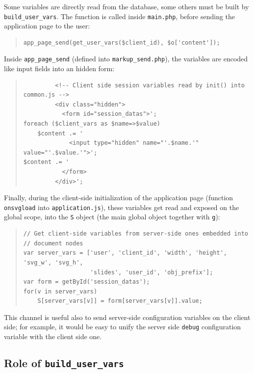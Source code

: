 \documentclass[10pt,a4paper,english]{book}
\begin{document}
Some variables are directly read from the database, some others must
be built by \texttt{build{\_}user{\_}vars}. The function is called inside
\texttt{main.php}, before sending the application page to the user:
\begin{quote}\begin{verbatim}
app_page_send(get_user_vars($client_id), $o['content']);
\end{verbatim}
\end{quote}

Inside \texttt{app{\_}page{\_}send} (defined into \texttt{markup{\_}send.php}), the
variables are encoded like input fields into an hidden form:
\begin{quote}\begin{verbatim}
         <!-- Client side session variables read by init() into common.js -->
         <div class="hidden">
           <form id="session_datas">';
foreach ($client_vars as $name=>$value)
    $content .= '
             <input type="hidden" name="'.$name.'" value="'.$value.'">';
$content .= '
           </form>
         </div>';
\end{verbatim}
\end{quote}

Finally, during the client-side initialization of the application page
(function \texttt{onsvgload} into \texttt{application.js}), these variables get
read and exposed on the global scope, into the \texttt{S} object (the main
global object together with \texttt{g}):
\begin{quote}\begin{verbatim}
// Get client-side variables from server-side ones embedded into
// document nodes
var server_vars = ['user', 'client_id', 'width', 'height', 'svg_w', 'svg_h',
                   'slides', 'user_id', 'obj_prefix'];
var form = getById('session_datas');
for(v in server_vars)
    S[server_vars[v]] = form[server_vars[v]].value;
\end{verbatim}
\end{quote}

This channel is useful also to send server-side configuration
variables on the client side; for example, it would be easy to unify
the server side \texttt{debug} configuration variable with the client side
one.



\hypertarget{role-of-build-user-vars}{}
\subsection{Role of \texttt{build{\_}user{\_}vars}}
\label{role-of-build-user-vars}
\end{document}
